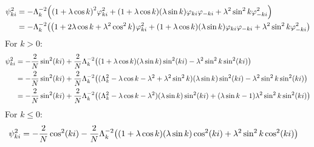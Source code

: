 \documentclass[../thesis.tex]{subfiles}
\begin{document}
\begin{align}
  \psi_{ki}^2
  &= -\Lambda_k^{-2} \qty(%
  {(1 + \lambda\cos k)}^2\varphi_{ki}^2
  + (1 + \lambda\cos k)(\lambda\sin k)\varphi_{ki}\varphi_{-ki}
  + \lambda^2\sin^2 k\varphi_{-ki}^2
  ) \\
  &= -\Lambda_k^{-2} \qty(%
  \qty(1 + 2\lambda\cos k + \lambda^2\cos^2 k)\varphi_{ki}^2
  + (1 + \lambda\cos k)(\lambda\sin k)\varphi_{ki}\varphi_{-ki}
  + \lambda^2\sin^2 k\varphi_{-ki}^2
  )
\end{align}
For $k > 0$:
\begin{align}
  \psi_{ki}^2
  &= -\frac{2}{N}\sin^2(ki)
  + \frac{2}{N}\Lambda_k^{-2}\qty(
  (1 + \lambda\cos k)(\lambda\sin k)\sin^2(ki)
  - \lambda^2\sin^2 k\sin^2(ki)
  ) \\
  &= -\frac{2}{N}\sin^2(ki)
  + \frac{2}{N}\Lambda_k^{-2}\qty(
  (\Lambda_k^2 - \lambda\cos k - \lambda^2 + \lambda^2\sin^2 k)(\lambda\sin k)\sin^2(ki)
  - \lambda^2\sin^2 k\sin^2(ki)
  ) \\
  &= -\frac{2}{N}\sin^2(ki)
  + \frac{2}{N}\Lambda_k^{-2}\qty(
  (\Lambda_k^2 - \lambda\cos k - \lambda^2)(\lambda\sin k)\sin^2(ki)
  + (\lambda\sin k - 1)\lambda^2\sin^2 k\sin^2(ki)
  ) \\
\end{align}
For $k \leq 0$:
\begin{align}
  \psi_{ki}^2
  &= -\frac{2}{N}\cos^2(ki)
  - \frac{2}{N}\Lambda_k^{-2}\qty(
  (1 + \lambda\cos k)(\lambda\sin k)\cos^2(ki)
  + \lambda^2\sin^2 k\cos^2(ki)
  )
\end{align}
\end{document}
